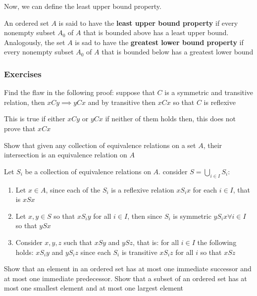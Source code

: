Now, we can define the least upper bound property.

\begin{defn}
	An ordered set $ A $ is said to have the \textbf{least upper bound property} if every nonempty subset $ A_0 $ of $ A $ that is bounded above has a least upper bound. Analogously, the set $ A $ is sad to have the \textbf{greatest lower bound property} if every nonempty subset $ A_0 $ of $ A $ that is bounded below has a greatest lower bound
\end{defn}
\subsubsection{Exercises}
\begin{exc}
	Find the flaw in the following proof: suppose that $ C $ is a symmetric and transitive relation, then $ xCy \implies yCx $ and by transitive then $ xCx $ so that $ C $ is reflexive
\end{exc}
\begin{sol}
	This is true if either $ xCy $ or $ yCx $ if neither of them holds then, this does not prove that $ xCx $
\end{sol}
\begin{exc}
	Show that given any collection of equivalence relations on a set $ A $, their intersection is an equivalence relation on $ A $
\end{exc}
\begin{sol}
	Let $ S_i $ be a collection of equivalence relations on $ A $. consider $ S = \bigcup_{i \in I}S_i $:
	\begin{enumerate}
		\item Let $ x \in A $, since each of the $ S_i  $ is a reflexive relation $ xS_ix $ for each $ i \in I $, that is $ xSx $
		\item Let $ x,y \in S  $ so that $ xS_i y $ for all $ i \in I $, then since $ S_i $ is symmetric $ yS_i x \forall i \in I $ so that $ ySx $
		\item Consider $ x,y,z $ such that $ xSy $ and $ ySz $, that is: for all $ i \in I $ the following holds: $ xS_i y $ and $ y S_i z $ since each $ S_i  $ is transitive $ x S_i z $ for all  $ i $ so that $ xSz $
	\end{enumerate}
\end{sol}
\begin{exc}
	Show that an element in an ordered set has at most one immediate successor and at most one immediate predecessor. Show that a subset of an ordered set has at most one smallest element and at most one largest element
\end{exc}
